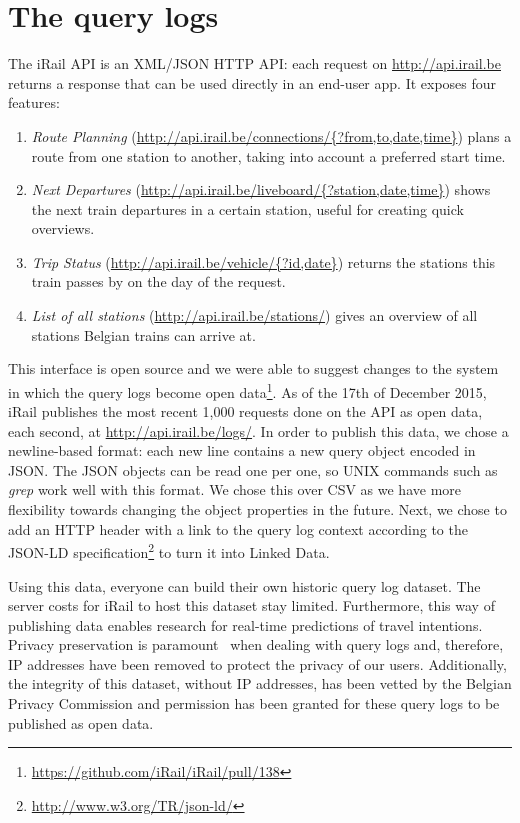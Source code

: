 \documentclass{sig-alternate}
\begin{document}
\section{The query logs}
\label{sec:logs}

The iRail API is an XML/JSON HTTP API: each request on \url{http://api.irail.be} returns a response that can be used directly in an end-user app.
It exposes four features: 
\begin{enumerate}
\item \emph{Route Planning} (\url{http://api.irail.be/connections/{?from,to,date,time}}) plans a route from one station to another, taking into account a preferred start time.
\item \emph{Next Departures} (\url{http://api.irail.be/liveboard/{?station,date,time}}) shows the next train departures in a certain station, useful for creating quick overviews.
\item \emph{Trip Status} (\url{http://api.irail.be/vehicle/{?id,date}}) returns the stations this train passes by on the day of the request.
\item \emph{List of all stations} (\url{http://api.irail.be/stations/}) gives an overview of all stations Belgian trains can arrive at.
\end{enumerate}

This interface is open source and we were able to suggest changes to the system in which the query logs become open data\footnote{\url{https://github.com/iRail/iRail/pull/138}}.
As of the 17th of December 2015, iRail publishes the most recent 1,000 requests done on the API as open data, each second, at \url{http://api.irail.be/logs/}.
In order to publish this data, we chose a newline-based format: each new line contains a new query object encoded in JSON. 
The JSON objects can be read one per one, so UNIX commands such as \emph{grep} work well with this format.
We chose this over CSV as we have more flexibility towards changing the object properties in the future.
Next, we chose to add an HTTP header with a link to the query log context according to the JSON-LD specification\footnote{\url{http://www.w3.org/TR/json-ld/}} to turn it into Linked Data.

Using this data, everyone can build their own historic query log dataset.
The server costs for iRail to host this dataset stay limited.
Furthermore, this way of publishing data enables research for real-time predictions of travel intentions.
Privacy preservation is paramount~\cite{silvestri} when dealing with query logs and, therefore, IP addresses have been removed to protect the privacy of our users. 
Additionally, the integrity of this dataset, without IP addresses, has been vetted by the Belgian Privacy Commission and permission has been granted for these query logs to be published as open data.
\end{document}
